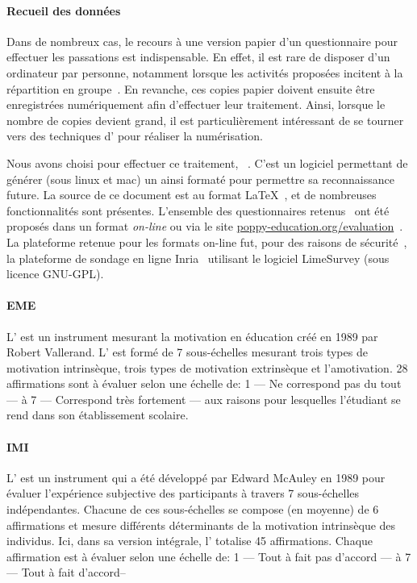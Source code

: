   \paragraph{Recueil des données}
    Dans de nombreux cas, le recours à une version papier d'un questionnaire pour effectuer les passations est indispensable. En effet, il est rare de disposer d'un ordinateur par personne, notamment lorsque les activités proposées incitent à la répartition en groupe~. En revanche, ces copies papier doivent ensuite être enregistrées numériquement afin d'effectuer leur traitement. Ainsi, lorsque le nombre de copies devient grand, il est particulièrement intéressant de se tourner vers des techniques d' pour réaliser la numérisation.\par%
    Nous avons choisi pour effectuer ce traitement, ~. C'est un logiciel permettant de générer (sous linux et mac) un  ainsi formaté pour permettre sa reconnaissance future. La source de ce document est au format \LaTeX{}~, et de nombreuses fonctionnalités sont présentes. L'ensemble des questionnaires retenus~ ont été proposés dans un format \textit{on-line} ou  via le site \href{https://www.poppy-education.org/evaluation}{poppy-education.org/evaluation}~. La plateforme retenue pour les formats on-line fut, pour des raisons de sécurité~, la plateforme de sondage en ligne Inria~ utilisant le logiciel LimeSurvey (sous licence GNU-GPL).
    \paragraph{EME}
    L' est un instrument mesurant la motivation en éducation créé en 1989 par Robert Vallerand. L’ est formé de 7 sous-échelles mesurant trois types de motivation intrinsèque, trois types de motivation extrinsèque et l’amotivation. 28 affirmations sont à évaluer selon une échelle de: 1 — Ne correspond pas du tout — à 7 — Correspond très fortement — aux raisons pour lesquelles l’étudiant se rend dans son établissement scolaire.~
    \paragraph{IMI}\label{q:imi}
    L' est un instrument qui a été développé par Edward McAuley en 1989 pour évaluer l’expérience subjective des participants à travers 7 sous-échelles indépendantes. Chacune de ces sous-échelles se compose (en moyenne) de 6 affirmations et mesure différents déterminants de la motivation intrinsèque des individus. Ici, dans sa version intégrale, l’ totalise 45 affirmations. Chaque affirmation est à évaluer selon une échelle de: 1 — Tout à fait pas d’accord — à 7 — Tout à fait d’accord–~
